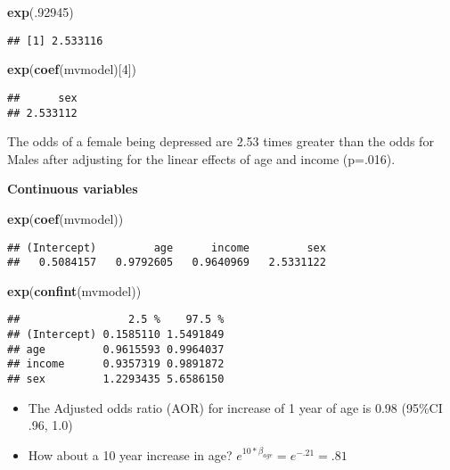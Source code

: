 \documentclass[]{article}
\newenvironment{Shaded}{\begin{snugshade}}{\end{snugshade}}
\newcommand{\KeywordTok}[1]{\textcolor[rgb]{0.13,0.29,0.53}{\textbf{{#1}}}}
\newcommand{\DecValTok}[1]{\textcolor[rgb]{0.00,0.00,0.81}{{#1}}}
\newcommand{\NormalTok}[1]{{#1}}
\begin{document}
\begin{Shaded}
\begin{Highlighting}[]
\KeywordTok{exp}\NormalTok{(.}\DecValTok{92945}\NormalTok{)}
\end{Highlighting}
\end{Shaded}

\begin{verbatim}
## [1] 2.533116
\end{verbatim}

\begin{Shaded}
\begin{Highlighting}[]
\KeywordTok{exp}\NormalTok{(}\KeywordTok{coef}\NormalTok{(mvmodel)[}\DecValTok{4}\NormalTok{])}
\end{Highlighting}
\end{Shaded}

\begin{verbatim}
##      sex 
## 2.533112
\end{verbatim}

The odds of a female being depressed are 2.53 times greater than the
odds for Males after adjusting for the linear effects of age and income
(p=.016).

\textbf{Continuous variables}

\begin{Shaded}
\begin{Highlighting}[]
\KeywordTok{exp}\NormalTok{(}\KeywordTok{coef}\NormalTok{(mvmodel))}
\end{Highlighting}
\end{Shaded}

\begin{verbatim}
## (Intercept)         age      income         sex 
##   0.5084157   0.9792605   0.9640969   2.5331122
\end{verbatim}

\begin{Shaded}
\begin{Highlighting}[]
\KeywordTok{exp}\NormalTok{(}\KeywordTok{confint}\NormalTok{(mvmodel))}
\end{Highlighting}
\end{Shaded}

\begin{verbatim}
##                 2.5 %    97.5 %
## (Intercept) 0.1585110 1.5491849
## age         0.9615593 0.9964037
## income      0.9357319 0.9891872
## sex         1.2293435 5.6586150
\end{verbatim}

\begin{itemize}
\itemsep1pt\parskip0pt
\item
  The Adjusted odds ratio (AOR) for increase of 1 year of age is 0.98
  (95\%CI .96, 1.0)
\item
  How about a 10 year increase in age?
  \(e^{10*\beta_{age}} = e^{-.21} = .81\)
\end{itemize}
\end{document}
